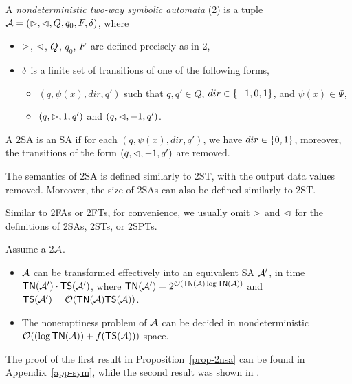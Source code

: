 \begin{definition}
    A \emph{nondeterministic two-way  symbolic \emph{automata}} (2\SA) is a tuple $\mathcal{A} = (\vartriangleright, \vartriangleleft, Q, q_0, F, \delta)$, where  
\begin{itemize}
%
\item $\vartriangleright$, $\vartriangleleft$, $Q$, $q_0$, $F$ are defined precisely as in 2\FA, 
%
\item $\delta$ is a finite set of  transitions of one of the following forms,
\begin{itemize}
\item     $(q, \psi(x), dir, q')$ such that $q, q' \in Q$, $dir \in \{-1, 0, 1\}$, and $\psi(x) \in \Psi$, 
%
\item     $(q, \vartriangleright, 1, q')$ and $(q, \vartriangleleft, -1, q')$. 
\end{itemize}
\end{itemize}
A 2SA is an SA if for each $(q, \psi(x), dir, q')$, we have $dir \in \{0, 1\}$, moreover, the transitions of the form $(q, \vartriangleleft, -1, q')$ are removed.
\end{definition}
The semantics of 2SA  is defined similarly to 2ST, with the output data values removed. Moreover, the size of 2SAs can also be defined similarly to 2ST.

Similar to 2FAs or 2FTs, for convenience, we usually omit $\vartriangleright$ and $\vartriangleleft$ for the definitions of 2SAs, 2STs, or 2SPTs.

\begin{proposition}\label{prop-2nsa}
Assume a 2\SA  $\mathcal{A}$.
\begin{itemize}
\item $\mathcal{A}$ can be transformed effectively into an equivalent SA $\mathcal{A}'$, in time $\mathsf{TN}(\mathcal{A}')\cdot \mathsf{TS}(\mathcal{A}')$, where $\mathsf{TN}(\mathcal{A}') = 2^{\mathcal{O}\left(\mathsf{TN}(\mathcal{A}) \log \mathsf{TN}(\mathcal{A})\right)}$ and $\mathsf{TS}(\mathcal{A}') = \mathcal{O}( \mathsf{TN}(\mathcal{A}) \mathsf{TS}(\mathcal{A}))$.
%
%
%
\item The nonemptiness problem of $\mathcal{A}$ can be decided in nondeterministic $\mathcal{O}( (\log \mathsf{TN}(\mathcal{A})) + f(\mathsf{TS}(\mathcal{A})))$ space.
\end{itemize}
\end{proposition}
The proof of the first result in Proposition~\ref{prop-2nsa} can be found in Appendix~\ref{app-sym}, while the second result was shown in \cite{NG01,DV14}.

